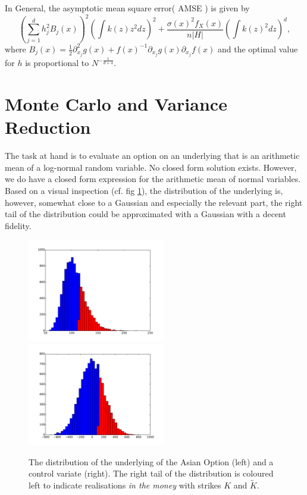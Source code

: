 \documentclass[a4paper,11pt]{article}
\begin{document}
In General, the asymptotic mean square error( AMSE ) is given by
\begin{equation*}
\left( \sum_{j=1}^{d} h_{j}^{2} B_{j}(x) \right)^{2} \left( \int k(z) z^{2} dz \right)^{2} +  \frac{ \sigma(x)^{2} f_{X}(x)}{n|H|}  \left( \int k(z)^2 dz \right)^{d},
\end{equation*}
where $B_{j}(x) = \frac{1}{2} \partial^{2}_{x_j} g(x) + f(x)^{-1} \partial_{x_j} g(x) \partial_{x_j}f(x)$ 
and the optimal value for $h$ is proportional to $N^{-\frac{1}{d+4}}$.

\section*{Monte Carlo and Variance Reduction}

The task at hand is to evaluate an option on an underlying that is an arithmetic
mean of a log-normal random variable. No closed form solution exists. However,
we do have a closed form expression for the arithmetic mean of normal variables.
Based on a visual inspection (cf. fig \ref{fig:loghist}), the distribution of the underlying is, however, somewhat
close to a Gaussian and especially the relevant part, the right tail of the distribution could 
be approximated with a Gaussian with a decent fidelity.
\begin{figure}
\begin{center}
\includegraphics[width=60mm]{./v_n_histogram.pdf}
\includegraphics[width=60mm]{./v_n_histogram_cv.pdf}
\end{center}
\caption{
\label{fig:loghist}
The distribution of the underlying of the Asian Option (left)
and a control variate (right). The right tail of the distribution is
coloured left to indicate
realisations \emph{in the money} with strikes $K$  and $\tilde K$.
}
\end{figure}
\end{document}
